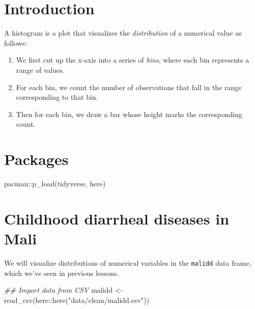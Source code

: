 \documentclass[
  letterpaper,
  DIV=11,
  numbers=noendperiod]{scrreprt}
\newenvironment{Shaded}{\begin{snugshade}}{\end{snugshade}}
\newcommand{\DocumentationTok}[1]{\textcolor[rgb]{0.37,0.37,0.37}{\textit{#1}}}
\newcommand{\FunctionTok}[1]{\textcolor[rgb]{0.28,0.35,0.67}{#1}}
\newcommand{\NormalTok}[1]{\textcolor[rgb]{0.00,0.23,0.31}{#1}}
\newcommand{\OtherTok}[1]{\textcolor[rgb]{0.00,0.23,0.31}{#1}}
\newcommand{\SpecialCharTok}[1]{\textcolor[rgb]{0.37,0.37,0.37}{#1}}
\newcommand{\StringTok}[1]{\textcolor[rgb]{0.13,0.47,0.30}{#1}}
\begin{document}
\section{Introduction}\label{introduction-15}

A histogram is a plot that visualizes the \emph{distribution} of a
numerical value as follows:

\begin{enumerate}
\def\labelenumi{\arabic{enumi}.}
\item
  We first cut up the x-axis into a series of \emph{bins}, where each
  bin represents a range of values.
\item
  For each bin, we count the number of observations that fall in the
  range corresponding to that bin.
\item
  Then for each bin, we draw a bar whose height marks the corresponding
  count.
\end{enumerate}

\section{Packages}\label{packages-11}

\begin{Shaded}
\begin{Highlighting}[]
\NormalTok{pacman}\SpecialCharTok{::}\FunctionTok{p\_load}\NormalTok{(tidyverse,}
\NormalTok{               here)}
\end{Highlighting}
\end{Shaded}

\section{Childhood diarrheal diseases in
Mali}\label{childhood-diarrheal-diseases-in-mali-1}

We will visualize distributions of numerical variables in the
\texttt{malidd} data frame, which we've seen in previous lessons.

\begin{Shaded}
\begin{Highlighting}[]
\DocumentationTok{\#\# Import data from CSV}
\NormalTok{malidd }\OtherTok{\textless{}{-}} \FunctionTok{read\_csv}\NormalTok{(here}\SpecialCharTok{::}\FunctionTok{here}\NormalTok{(}\StringTok{"data/clean/malidd.csv"}\NormalTok{))}
\end{Highlighting}
\end{Shaded}
\end{document}

